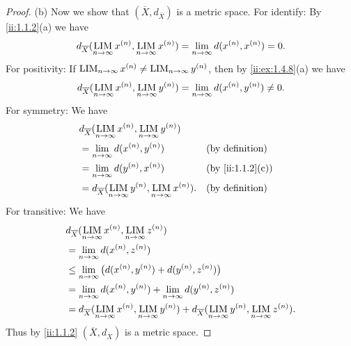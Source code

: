 \begin{proof}{(b)}
  Now we show that \((\overline{X}, d_{\overline{X}})\) is a metric space.
  For identify:
  By \cref{ii:1.1.2}(a) we have
  \[
    d_{\overline{X}}(\operatorname*{LIM}_{n \to \infty} x^{(n)}, \operatorname*{LIM}_{n \to \infty} x^{(n)}) = \lim_{n \to \infty} d(x^{(n)}, x^{(n)}) = 0.
  \]
  For positivity:
  If \(\operatorname*{LIM}_{n \to \infty} x^{(n)} \neq \operatorname*{LIM}_{n \to \infty} y^{(n)}\), then by \cref{ii:ex:1.4.8}(a) we have
  \[
    d_{\overline{X}}(\operatorname*{LIM}_{n \to \infty} x^{(n)}, \operatorname*{LIM}_{n \to \infty} y^{(n)}) = \lim_{n \to \infty} d(x^{(n)}, y^{(n)}) \neq 0.
  \]
  For symmetry:
  We have
  \begin{align*}
     & d_{\overline{X}}(\LIM_{n \to \infty} x^{(n)}, \LIM_{n \to \infty} y^{(n)})                                \\
     & = \lim_{n \to \infty} d(x^{(n)}, y^{(n)})                                     &  & \text{(by definition)} \\
     & = \lim_{n \to \infty} d(y^{(n)}, x^{(n)})                                     &  & \by{ii:1.1.2}[c]       \\
     & = d_{\overline{X}}(\LIM_{n \to \infty} y^{(n)}, \LIM_{n \to \infty} x^{(n)}). &  & \text{(by definition)}
  \end{align*}
  For transitive:
  We have
  \begin{align*}
     & d_{\overline{X}}(\operatorname*{LIM}_{n \to \infty} x^{(n)}, \operatorname*{LIM}_{n \to \infty} z^{(n)})                                                                                 \\
     & = \lim_{n \to \infty} d(x^{(n)}, z^{(n)})                                                                                                                  \\
     & \leq \lim_{n \to \infty} \big(d(x^{(n)}, y^{(n)}) + d(y^{(n)}, z^{(n)})\big)                                                                               \\
     & = \lim_{n \to \infty} d(x^{(n)}, y^{(n)}) + \lim_{n \to \infty} d(y^{(n)}, z^{(n)})                                                                        \\
     & = d_{\overline{X}}(\operatorname*{LIM}_{n \to \infty} x^{(n)}, \operatorname*{LIM}_{n \to \infty} y^{(n)}) + d_{\overline{X}}(\operatorname*{LIM}_{n \to \infty} y^{(n)}, \operatorname*{LIM}_{n \to \infty} z^{(n)}).
  \end{align*}
  Thus by \cref{ii:1.1.2} \((\overline{X}, d_{\overline{X}})\) is a metric space.
\end{proof}

